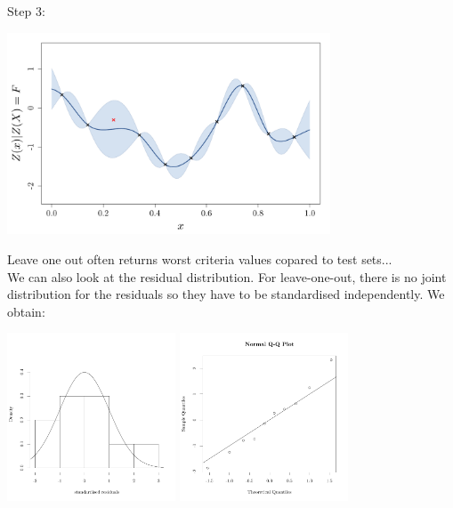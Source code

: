 \documentclass{beamer}
\begin{document}
\begin{frame}{}
Step 3:\\ \vspace{3mm}
\begin{center}
\includegraphics[height=6cm]{figures/R/VALID_crossval3}
\end{center}
\end{frame}

\begin{frame}{}
Leave one out often returns worst criteria values copared to test sets... \\
 \vspace{5mm}
We can also look at the residual distribution. For leave-one-out, there is no joint distribution for the residuals so they have to be standardised independently. We obtain: 
\begin{center}
\includegraphics[height=5cm]{figures/R/VALID_crossvalhist} \qquad
\includegraphics[height=5cm]{figures/R/VALID_crossvalqqplot}
\end{center}
\end{frame}
\end{document}
